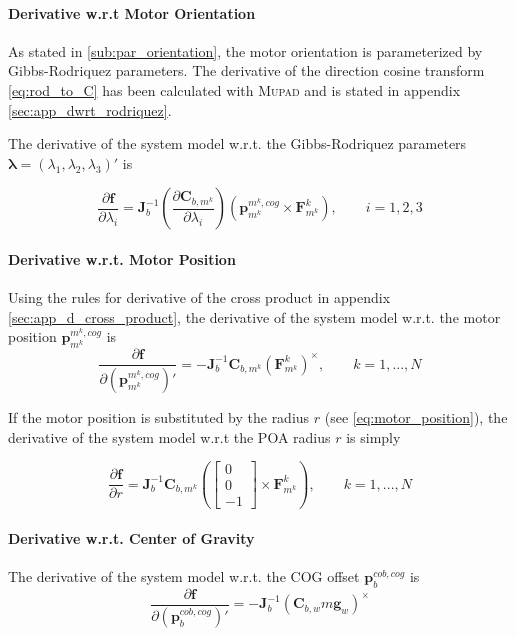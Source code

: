 \paragraph{Derivative w.r.t Motor Orientation\\}
As stated in \cref{sub:par_orientation}, the motor orientation is parameterized by Gibbs-Rodriquez parameters. The derivative of the direction cosine transform \cref{eq:rod_to_C} has been calculated with \textsc{Mupad} and is stated in appendix \ref{sec:app_dwrt_rodriquez}.

The derivative of the system model w.r.t. the Gibbs-Rodriquez parameters $\boldsymbol{\lambda} = (\lambda_1, \lambda_2, \lambda_3)'$ is

\begin{equation}
\frac{\partial \mathbf{f}}{\partial \lambda_i} =
\mathbf{J}_b^{-1} 
\left( \frac{\partial \mathbf{C}_{b,m^k}}{\partial \lambda_i} \right)
\left( \mathbf{p}^{m^k,cog}_{m^k} \times \mathbf{F}^k_{m^k} \right)
, \qquad i = 1,2,3
\end{equation}

\paragraph{Derivative w.r.t. Motor Position\\}
Using the rules for derivative of the cross product in appendix \ref{sec:app_d_cross_product}, the derivative of the system model w.r.t. the motor position $\mathbf{p}^{m^k,cog}_{m^k}$ is
\begin{equation}
\frac{\partial \mathbf{f}}{\partial (\mathbf{p}^{m^k,cog}_{m^k})'} =
- \mathbf{J}_b^{-1} 
\mathbf{C}_{b,m^k}
\left( \mathbf{F}^k_{m^k} \right) ^\times
, \qquad k = 1,...,N
\end{equation}

If the motor position is substituted by the radius $r$ (see \cref{eq:motor_position}), the derivative of the system model w.r.t the POA radius $r$ is simply

\begin{equation}
\frac{\partial \mathbf{f}}{\partial r} =
\mathbf{J}_b^{-1} 
\mathbf{C}_{b,m^k}
\left(
\left[ \begin{array}{c}
0 \\
0 \\
-1
\end{array} \right]
\times
\mathbf{F}^k_{m^k} \right)
, \qquad k = 1,...,N
\end{equation}

\paragraph{Derivative w.r.t. Center of Gravity\\}
The derivative of the system model w.r.t. the COG offset $\mathbf{p}^{cob,cog}_{b}$ is
\begin{equation}
\frac{\partial \mathbf{f}}{\partial (\mathbf{p}^{cob,cog}_{b})'} =
-
\mathbf{J}_b^{-1} 
\left( \mathbf{C}_{b,w} m \mathbf{g}_w \right) ^\times
\end{equation}

